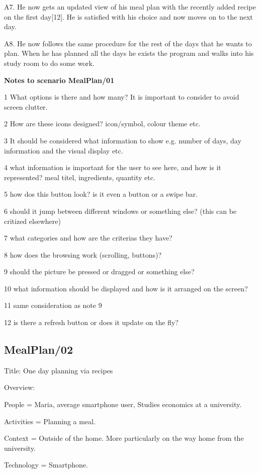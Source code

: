 	A7. He now gets an updated view of his meal plan with the recently added recipe on the first day[12]. He is satisfied with his choice and now moves on to the next day. 
	
	A8. He now follows the same procedure for the rest of the days that he wants to plan. When he has planned all the days he exists the program and walks into his study room to do some work.
	
\textbf{Notes to scenario MealPlan/01}

1 What options is there and how many? It is important to consider to avoid screen clutter.

2 How are these icons designed? icon/symbol, colour theme etc.

3 It should be considered what information to show e.g. number of days, day information and the visual display etc.

4 what information is important for the user to see here, and how is it represented? meal titel, ingredients, quantity etc.

5 how dos this button look? is it even a button or a swipe bar.

6 should it jump between different windows or something else? (this can be critized elsewhere)

7 what categories and how are the criterias they have?

8 how does the browsing work (scrolling, buttons)?

9 should the picture be pressed or dragged or something else?

10 what information should be displayed and how is it arranged on the screen?

11 same consideration as note 9

12 is there a refresh button or does it update on the fly?

\subsection{MealPlan/02} \label{MealPlan02}

Title: One day planning via recipes

Overview:

	People = Maria, average smartphone user, Studies economics at a university. 
	
	Activities = Planning a meal.

	Context = Outside of the home. More particularly on the way home from the university.

	Technology = Smartphone.

